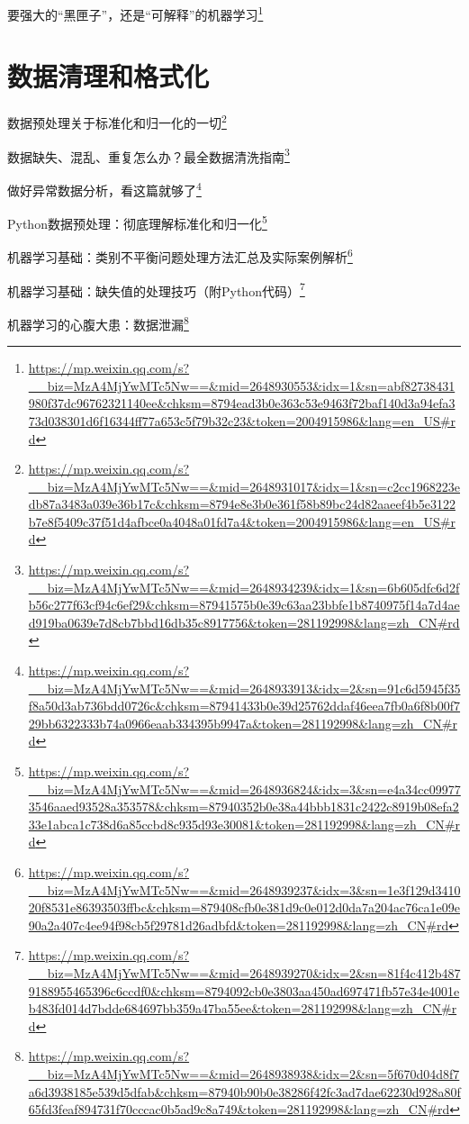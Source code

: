 \documentclass[]{ctexbook}
\renewcommand{\href}[2]{#2\footnote{\url{#1}}}
\begin{document}
\href{https://mp.weixin.qq.com/s?__biz=MzA4MjYwMTc5Nw==\&mid=2648930553\&idx=1\&sn=abf82738431980f37dc96762321140ee\&chksm=8794ead3b0e363c53e9463f72baf140d3a94efa373d038301d6f16344ff77a653c5f79b32c23\&token=2004915986\&lang=en_US\#rd}{要强大的``黑匣子''，还是``可解释''的机器学习}

\hypertarget{ux6570ux636eux6e05ux7406ux548cux683cux5f0fux5316}{%
\section{数据清理和格式化}\label{ux6570ux636eux6e05ux7406ux548cux683cux5f0fux5316}}

\href{https://mp.weixin.qq.com/s?__biz=MzA4MjYwMTc5Nw==\&mid=2648931017\&idx=1\&sn=c2cc1968223edb87a3483a039e36b17c\&chksm=8794e8e3b0e361f58b89bc24d82aaeef4b5e3122b7e8f5409c37f51d4afbce0a4048a01fd7a4\&token=2004915986\&lang=en_US\#rd}{数据预处理\textbar{}关于标准化和归一化的一切}

\href{https://mp.weixin.qq.com/s?__biz=MzA4MjYwMTc5Nw==\&mid=2648934239\&idx=1\&sn=6b605dfc6d2fb56c277f63cf94c6ef29\&chksm=87941575b0e39c63aa23bbfe1b8740975f14a7d4aed919ba0639e7d8cb7bbd16db35c8917756\&token=281192998\&lang=zh_CN\#rd}{数据缺失、混乱、重复怎么办？最全数据清洗指南}

\href{https://mp.weixin.qq.com/s?__biz=MzA4MjYwMTc5Nw==\&mid=2648933913\&idx=2\&sn=91c6d5945f35f8a50d3ab736bdd0726c\&chksm=87941433b0e39d25762ddaf46eea7fb0a6f8b00f729bb6322333b74a0966eaab334395b9947a\&token=281192998\&lang=zh_CN\#rd}{做好异常数据分析，看这篇就够了}

\href{https://mp.weixin.qq.com/s?__biz=MzA4MjYwMTc5Nw==\&mid=2648936824\&idx=3\&sn=e4a34cc099773546aaed93528a353578\&chksm=87940352b0e38a44bbb1831c2422c8919b08efa233e1abca1c738d6a85ccbd8c935d93e30081\&token=281192998\&lang=zh_CN\#rd}{Python数据预处理：彻底理解标准化和归一化}

\href{https://mp.weixin.qq.com/s?__biz=MzA4MjYwMTc5Nw==\&mid=2648939237\&idx=3\&sn=1e3f129d341020f8531e86393503ffbc\&chksm=879408cfb0e381d9c0e012d0da7a204ac76ca1e09e90a2a407c4ee94f98cb5f29781d26adbfd\&token=281192998\&lang=zh_CN\#rd}{机器学习基础：类别不平衡问题处理方法汇总及实际案例解析}

\href{https://mp.weixin.qq.com/s?__biz=MzA4MjYwMTc5Nw==\&mid=2648939270\&idx=2\&sn=81f4c412b4879188955465396c6ccdf0\&chksm=8794092cb0e3803aa450ad697471fb57e34e4001eb483fd014d7bdde684697bb359a47ba55ee\&token=281192998\&lang=zh_CN\#rd}{机器学习基础：缺失值的处理技巧（附Python代码）}

\href{https://mp.weixin.qq.com/s?__biz=MzA4MjYwMTc5Nw==\&mid=2648938938\&idx=2\&sn=5f670d04d8f7a6d3938185e539d5dfab\&chksm=87940b90b0e38286f42fc3ad7dae62230d928a80f65fd3feaf894731f70cccac0b5ad9c8a749\&token=281192998\&lang=zh_CN\#rd}{机器学习的心腹大患：数据泄漏}
\end{document}
